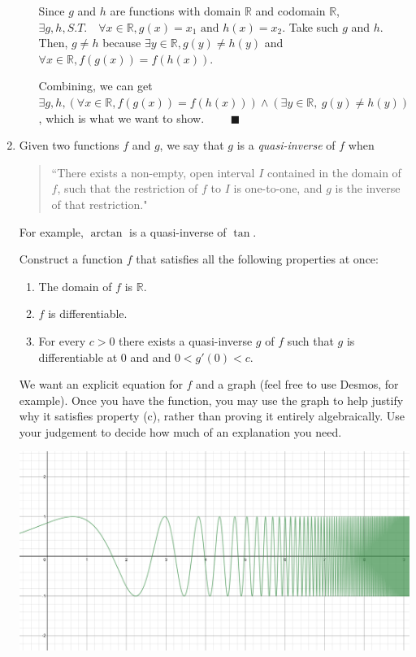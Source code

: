 \documentclass[12pt]{exam}
\newcommand{\vv}{\vspace{.1cm}}
\newcommand{\R}{\mathbb{R}}
\begin{document}
\begin{enumerate}
\begin{enumerate}
{	Since $g$ and $h$ are functions with domain $\R$ and codomain $\R$, $\exists g, h, S.T. \quad \forall x \in \R, g(x) = x_1 \mbox{ and } h(x) = x_2$.
	Take such $g$ and $h$. Then, $g \neq h$ because $\exists y \in \R, g(y) \neq h(y)$ and $\forall x \in \R, f(g(x)) = f(h(x))$.


	Combining, we can get $\exists g, h, (\forall x \in \R, f(g(x)) = f(h(x))) \land (\exists y \in \R,~ g(y) \neq h(y))$, which is what we want to show. $\qquad \blacksquare$ 
}
	\end{enumerate}

\vv
\newpage

\item   Given two functions $f$ and $g$, we say that $g$ is a \emph{quasi-inverse} of $f$ when
	\begin{quote}
	``There exists a non-empty, open interval $I$ contained in the domain of $f$, such that the restriction of $f$ to $I$ is one-to-one, and $g$ is the inverse of that restriction."
	\end{quote}
For example, $\arctan$ is a quasi-inverse of $\tan$.

Construct a function $f$ that satisfies all the following properties at once:
	\begin{enumerate}
		\item  The domain of $f$ is $\R$.
		\item  $f$ is differentiable.
		\item  \label{long} For every $c>0$ there exists a quasi-inverse $g$ of $f$ such that $g$ is differentiable at $0$ and and $0 < g'(0) < c$.
	\end{enumerate}

We want an explicit equation for $f$ and a graph (feel free to use Desmos, for example).  Once you have the function, you may use the graph to help justify why it satisfies property (c), rather than proving it entirely algebraically.  Use your judgement to decide how much of an explanation you need.

\includegraphics[scale=0.4]{a4}



\end{enumerate}
\end{document}
